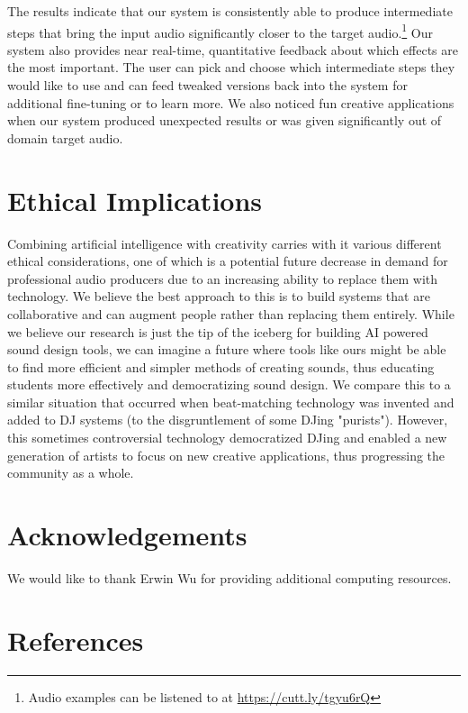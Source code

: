 \documentclass{article}
\begin{document}
The results indicate that our system is consistently able to produce intermediate steps that bring the input audio significantly closer to the target audio.\footnote{Audio examples can be listened to at \url{https://cutt.ly/tgyu6rQ}} Our system also provides near real-time, quantitative feedback about which effects are the most important. The user can pick and choose which intermediate steps they would like to use and can feed tweaked versions back into the system for additional fine-tuning or to learn more. We also noticed fun creative applications when our system produced unexpected results or was given significantly out of domain target audio. 

\section{Ethical Implications}

Combining artificial intelligence with creativity carries with it various different ethical considerations, one of which is a potential future decrease in demand for professional audio producers due to an increasing ability to replace them with technology. We believe the best approach to this is to build systems that are collaborative and can augment people rather than replacing them entirely. While we believe our research is just the tip of the iceberg for building AI powered sound design tools, we can imagine a future where tools like ours might be able to find more efficient and simpler methods of creating sounds, thus educating students more effectively and democratizing sound design. We compare this to a similar situation that occurred when beat-matching technology was invented and added to DJ systems (to the disgruntlement of some DJing "purists"). However, this sometimes controversial technology democratized DJing and enabled a new generation of artists to focus on new creative applications, thus progressing the community as a whole.

\section{Acknowledgements}

We would like to thank Erwin Wu for providing additional computing resources.

\section{References}
\small
\end{document}
